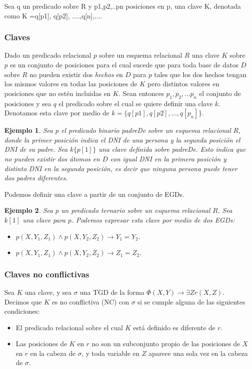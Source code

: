 \documentclass[11pt,a4paper,twoside]{tesis}
\newtheorem{exmp}{Ejemplo}
\begin{document}
Sea q un predicado sobre R y p1,p2,..pn posiciones en p, una clave K, denotada como K ={q[p1], q[p2], ....,q[n]},.... 

\subsubsection{Claves}
Dado un predicado relacional $p$ sobre un esquema relacional $R$ una clave $K$ sobre $p$ es un conjunto de posiciones para el cual sucede que para toda base de datos $D$ sobre $R$ no pueden existir dos \textit{hechos} en $D$ para $p$ tales que los dos hechos tengan los mismos valores en todas las posiciones de $K$ pero distintos valores en posiciones que no estén incluidas en $K$. Sean entonces $p_1, p_2,...p_n$ el conjunto de posiciones y sea $q$ el predicado sobre el cual se quiere definir una clave $k$. Denotamos esta clave por medio de $k=\{q[p1], q[p2], ...,q[p_n]\}$.

\begin{exmp}
Sea $p$ el predicado binario \textit{padreDe} sobre un esquema relacional $R$, donde la primer posición indica el DNI de una persona y la segunda posición el DNI de su padre. Sea $k\{p[1]\}$ una clave definida sobre \textit{padreDe}. Esto indica que no pueden existir dos átomos en $D$ con igual DNI en la primera posición y distinto DNI en la segunda posición, es decir que ninguna persona puede tener dos padres diferentes.
\end{exmp}

Podemos definir una clave a partir de un conjunto de EGDs.
\begin{exmp}
Sea $p$ un predicado ternario sobre un esquema relacional $R$. Sea $k[1]$ una clave para $p$. Podemos expresar esta clave por medio de dos EGDs:
\begin{itemize}
    \item $p(X, Y_1, Z_1) \land p(X, Y_2, Z_2) \rightarrow Y_1 = Y_2$.
    \item $p(X, Y_1, Z_1) \land p(X, Y_2, Z_2) \rightarrow Z_1 = Z_2$.
\end{itemize}
\end{exmp}


\subsubsection{Claves no conflictivas}\label{claves_no_conflictivas}
Sea $K$ una clave, y sea $\sigma$ una TGD de la forma $\Phi(X, Y) \rightarrow \exists Z r(X, Z)$. Decimos que $K$ es no conflictiva (NC) con $\sigma$ si se cumple alguna de las siguientes condiciones:
\begin{itemize}
    \item El predicado relacional sobre el cual $K$ está definido es diferente de $r$.
    \item Las posiciones de $K$ en $r$ no son un subconjunto propio de las posiciones de $X$ en $r$ en la cabeza de $\sigma$, y toda variable en $Z$ aparece una sola vez en la cabeza de $\sigma$. 
\end{itemize}
\end{document}
